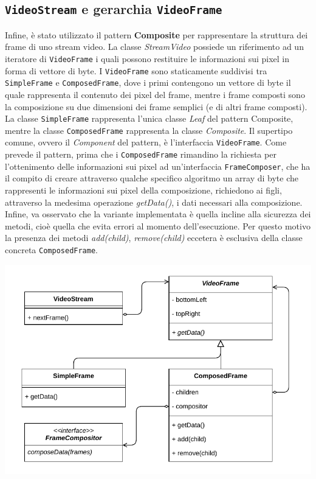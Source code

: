 \documentclass[a4paper,11pt]{article}
\begin{document}
	
	\subsection{\texttt{VideoStream} e gerarchia \texttt{VideoFrame}}
	Infine, è stato utilizzato il pattern \textbf{Composite} per rappresentare la struttura dei frame di uno stream video. La classe \textit{StreamVideo} possiede un riferimento ad un iteratore di \texttt{VideoFrame} i quali possono restituire le informazioni sui pixel in forma di vettore di byte. I \texttt{VideoFrame} sono staticamente suddivisi tra \texttt{SimpleFrame} e \texttt{ComposedFrame}, dove i primi contengono un vettore di byte il quale rappresenta il contenuto dei pixel del frame, mentre i frame composti sono la composizione su due dimensioni dei frame semplici (e di altri frame composti). La classe \texttt{SimpleFrame} rappresenta l'unica classe \textit{Leaf} del pattern Composite, mentre la classe \texttt{ComposedFrame} rappresenta la classe \textit{Composite}. Il supertipo comune, ovvero il \textit{Component} del pattern, è l'interfaccia \texttt{VideoFrame}. 
	Come prevede il pattern, prima che i \texttt{ComposedFrame} rimandino la richiesta per l'ottenimento delle informazioni sui pixel ad un'interfaccia \texttt{FrameComposer}, che ha il compito di creare attraverso qualche specifico algoritmo un array di byte che rappresenti le informazioni sui pixel della composizione, richiedono ai figli, attraverso la medesima operazione \textit{getData()}, i dati necessari alla composizione.\\
	Infine, va osservato che la variante implementata è quella incline alla sicurezza dei metodi, cioè quella che evita errori al momento dell'esecuzione. Per questo motivo la presenza dei metodi \textit{add(child)}, \textit{remove(child)} eccetera è esclusiva della classe concreta \texttt{ComposedFrame}.\\
	\begin{minipage}[c]{\textwidth}
		\centering
		\includegraphics[width=.5\textwidth]{diagramma/ClassDiagramm-VideoStream.pdf}
		\label{fig:videostream}
	\end{minipage}
	
\end{document}
